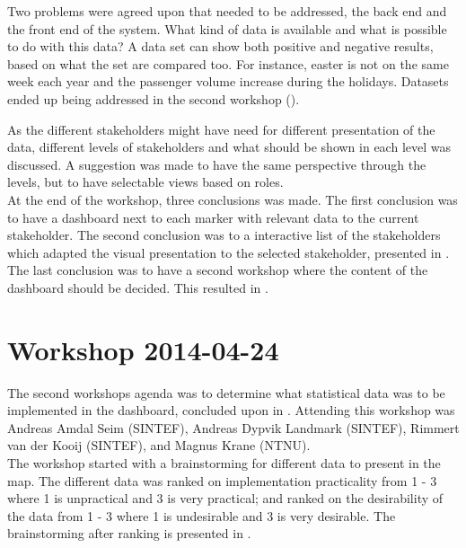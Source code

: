 Two problems were agreed upon that needed to be addressed, the back end and 
the  front end of the system. What kind of data is available and what is 
possible to do with this data? A data set can show both positive and negative 
results, based on what the set are compared too. For instance, easter is not 
on the same week each year and the passenger volume increase during the 
holidays. Datasets ended up being addressed in the second workshop (). 

As the different stakeholders might have need for different presentation of the
data, different levels of stakeholders and what should be shown in each level 
was discussed. A suggestion was made to have the same perspective through the
levels, but to have selectable views based on roles. \\

At the end of the workshop, three conclusions was made. The first conclusion 
was to have a dashboard next to each marker with relevant data to the current 
stakeholder. The second conclusion was to a interactive list of the
stakeholders which adapted the visual presentation to the selected stakeholder,
presented in .
The last conclusion was to have a second workshop where the content of the
dashboard should be decided. This resulted in .


\section{Workshop 2014-04-24} %
\label{sec:workshop_2014_04_24}
The second workshops agenda was to determine what statistical data was 
to be implemented in the dashboard, concluded upon in .
Attending this workshop was Andreas Amdal Seim (SINTEF), Andreas Dypvik 
Landmark (SINTEF), Rimmert van der Kooij (SINTEF), and Magnus Krane (NTNU).\\

The workshop started with a brainstorming for different data to present in
the map. The different data was ranked on implementation practicality from 1 - 
3 where 1 is unpractical and 3 is very practical; and ranked on the 
desirability of the data from 1 - 3 where 1 is undesirable and 3 is very 
desirable. The brainstorming after ranking is presented in .
\\

